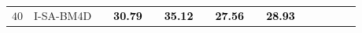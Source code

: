 \documentclass[10pt, a4paper]{article}
\newcommand{\bsic}[1]{\textcolor{black}{\textit{#1}}}
\newcommand{\Bsic}[1]{\textcolor{black}{\textbf{\textit{#1}}}}
\newcommand{\Best}[1]{\textbf{\textcolor{black}{#1}}}
\begin{document}
\begin{landscape}
\begin{table}[htp!]
\begin{center}
{\begin{tabular}{ c | l |c c | c c | c c | c c | c c | c c | c }
%
			\multirow{1}{*}{$40$}
			                      & I-SA-BM4D            & \bsic{     } & \Best{30.79} & \bsic{     } & \Best{35.12}  & \bsic{     } & \Best{27.56}  & \bsic{     } & \Best{28.93} &              &               &              &              &              \\

\end{tabular}}
\end{center}
\end{table}
\end{landscape}
\end{document}
